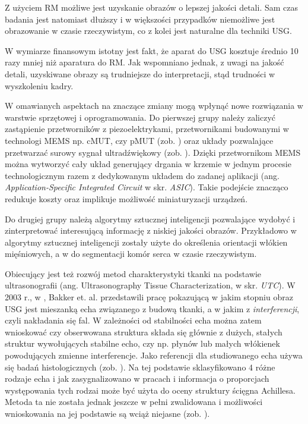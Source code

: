 Z użyciem RM możliwe jest uzyskanie obrazów o lepszej jakości detali. Sam czas badania jest natomiast dłuższy i w większości przypadków niemożliwe jest obrazowanie w czasie rzeczywistym, co z kolei jest naturalne dla techniki USG.

W wymiarze finansowym istotny jest fakt, że aparat do USG kosztuje średnio 10 razy mniej niż aparatura do RM. Jak wspomniano jednak, z uwagi na jakość detali, uzyskiwane obrazy są trudniejsze do interpretacji, stąd trudności w  wyszkoleniu kadry. 

W omawianych aspektach na znaczące zmiany mogą wpłynąć nowe rozwiązania w warstwie sprzętowej i oprogramowania. Do pierwszej grupy należy zaliczyć zastąpienie przetworników z piezoelektrykami, przetwornikami budowanymi w technologi MEMS np. cMUT, czy pMUT (zob. \cite{Butterfly2018}) oraz układy pozwalające przetwarzać surowy sygnał ultradźwiękowy (zob. \cite{US4US}). Dzięki przetwornikom MEMS można wytworzyć cały układ generujący drgania w krzemie w jednym procesie technologicznym razem z dedykowanym układem do zadanej aplikacji (ang. \textit{Application-Specific Integrated Circuit} w skr. \textit{ASIC}). Takie podejście znacząco redukuje koszty oraz implikuje możliwość miniaturyzacji urządzeń.

Do drugiej grupy należą algorytmy sztucznej inteligencji pozwalające wydobyć i zinterpretować interesującą informację z niskiej jakości obrazów. Przykładowo w \cite{Cunningham2017} algorytmy sztucznej inteligencji zostały użyte do określenia orientacji włókien mięśniowych, a w \cite{NVIDIA-CLARA} do segmentacji komór serca w czasie rzeczywistym. 

Obiecujący jest też rozwój metod charakterystyki tkanki na podstawie ultrasonografii (ang. Ultrasonography Tissue Characterization, w skr. \textit{UTC}). W 2003 r., w \cite{Bakker2003}, Bakker et. al. przedstawili pracę pokazującą w jakim stopniu obraz USG jest mieszanką echa związanego z budową tkanki, a w jakim z \textit{interferencji}, czyli nakładania się fal. W zależności od stabilności echa można zatem wnioskować czy obserwowana struktura składa się głównie z dużych, stałych struktur wywołujących stabilne echo, czy np. płynów lub małych włókienek powodujących zmienne interferencje. Jako referencji dla studiowanego echa używa się badań histologicznych (zob. \cite{Bakker2000}). Na tej podstawie sklasyfikowano 4 różne rodzaje echa i jak zasygnalizowano w pracach \cite{vanSchie2009} i \cite{Heyward2018} informacja o proporcjach występowania tych rodzai może być użyta do oceny struktury ścięgna Achillesa. Metoda ta nie została jednak jeszcze w pełni zwalidowana i możliwości wnioskowania na jej podstawie są wciąż niejasne (zob. \cite{Heyward2018}).

